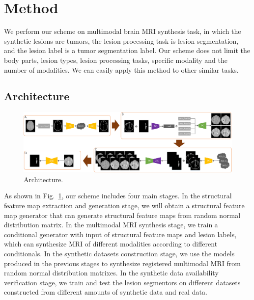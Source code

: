 \documentclass[letterpaper]{article} %
\begin{document}
\section{Method}
\label{method}
We perform our scheme on multimodal brain MRI synthesis task, in which the synthetic lesions are tumors, the lesion processing task is lesion segmentation, and the lesion label is a tumor segmentation label. Our scheme does not limit the body parts, lesion types, lesion processing tasks, specific modality and the number of modalities. We can easily apply this method to other similar tasks.

\subsection{Architecture}
\begin{figure}[t]
	\centering
	\includegraphics[width=0.95\columnwidth]{figures/architecture}
	\caption{Architecture.}
	\label{architecture}
\end{figure}
As shown in Fig.~\ref{architecture}, our scheme includes four main stages. 
In the structural feature map extraction and generation stage, we will obtain a structural feature map generator that can generate structural feature maps from random normal distribution matrix. 
In the multimodal MRI synthesis stage, we train a conditional generator with input of structural feature maps and lesion labels, which can synthesize MRI of different modalities according to different conditionals.
In the synthetic datasets construction stage, we use the models produced in the previous stages to synthesize registered multimodal MRI from random normal distribution matrixes. 
In the synthetic data availability verification stage, we train and test the lesion segmentors on different datasets constructed from different amounts of synthetic data and real data.
\end{document}
